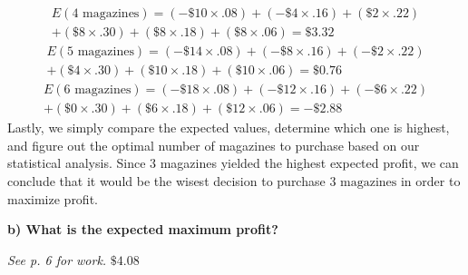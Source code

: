 \documentclass[12pt, letter]{article}
\begin{document}
\begin{center}
	\begin{multline*}
		E(\text{4 magazines})=\left(-\$10 \times .08\right)+\left(-\$4 \times .16\right)+\left(\$2 \times .22\right) \\
		+\left(\$8 \times .30\right)+\left(\$8 \times .18\right)+\left(\$8 \times .06\right)=\$3.32
	\end{multline*}
	\begin{multline*}
		E(\text{5 magazines})=\left(-\$14 \times .08\right)+\left(-\$8 \times .16\right)+\left(-\$2 \times .22\right) \\
		+\left(\$4 \times .30\right)+\left(\$10 \times .18\right)+\left(\$10 \times .06\right)=\$0.76
	\end{multline*}
	\begin{multline*}
		E(\text{6 magazines})=\left(-\$18 \times .08\right)+\left(-\$12 \times .16\right)+\left(-\$6 \times .22\right) \\
		+\left(\$0 \times .30\right)+\left(\$6 \times .18\right)+\left(\$12 \times .06\right)=-\$2.88
	\end{multline*}
	Lastly, we simply compare the expected values, determine which one is highest, and figure out the optimal number of magazines to purchase based on our statistical analysis. Since 3 magazines yielded the highest expected profit, we can conclude that it would be the wisest decision to purchase $\boxed{\text{3 magazines}}$ in order to maximize profit.
\end{center}

\textbf{b) What is the expected maximum profit?}
\begin{center}
	\textit{See p. 6 for work.} $\boxed{\$4.08}$
\end{center}
\end{document}
